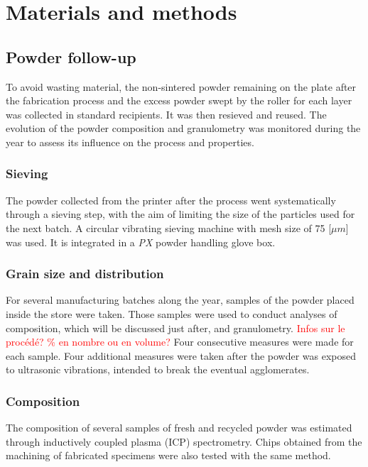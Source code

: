 \chapter{Materials and methods}
\label{Chap3}
\section{Powder follow-up}

To avoid wasting material, the non-sintered powder remaining on the plate after the fabrication process and the excess powder swept by the roller for each layer was collected in standard recipients. It was then resieved and reused. The evolution of the powder composition and granulometry was monitored during the year to assess its influence on the process and properties.

\subsection{Sieving}

The powder collected from the printer after the process went systematically through a sieving step, with the aim of limiting the size of the particles used for the next batch. A circular vibrating sieving machine with mesh size of 75 [$\mu m$] was used. It is integrated in a \textit{PX} powder handling glove box.

\subsection{Grain size and distribution}

For several manufacturing batches along the year, samples of the powder placed inside the store were taken. Those samples were used to conduct analyses of composition, which will be discussed just after, and granulometry. \textcolor{red}{Infos sur le procédé? \% en nombre ou en volume?} Four consecutive measures were made for each sample. Four additional measures were taken after the powder was exposed to ultrasonic vibrations, intended to break the eventual agglomerates. 

\subsection{Composition}

The composition of several samples of fresh and recycled powder was estimated through inductively coupled plasma (ICP) spectrometry. Chips obtained from the machining of fabricated specimens were also tested with the same method.\\

